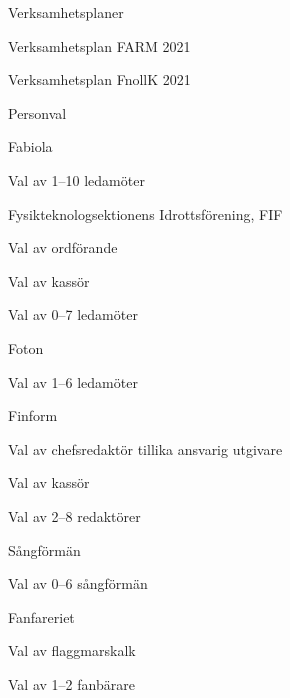 \documentclass{sektionsmote}
\begin{document}
\begin{ootd}
\item{Verksamhetsplaner}
\begin{ootd}
    \item Verksamhetsplan FARM 2021
    \item Verksamhetsplan FnollK 2021
\end{ootd}


\item{Personval}
\begin{ootd}
    \item Fabiola
    \begin{ootd}
        \item Val av 1--10 ledamöter
    \end{ootd}
    \item Fysikteknologsektionens Idrottsförening, FIF
    \begin{ootd}
        \item Val av ordförande
        \item Val av kassör
        \item Val av 0--7 ledamöter
    \end{ootd}
    \item Foton
    \begin{ootd}
        \item Val av 1--6 ledamöter
    \end{ootd}
    \item Finform
    \begin{ootd}
        \item Val av chefsredaktör tillika ansvarig utgivare
        \item Val av kassör
        \item Val av 2--8 redaktörer
    \end{ootd}
    \item Sångförmän
    \begin{ootd}
        \item Val av 0--6 sångförmän
    \end{ootd}
    \item Fanfareriet
    \begin{ootd}
        \item Val av flaggmarskalk
        \item Val av 1--2 fanbärare
    \end{ootd}

\end{ootd}
\end{ootd}
\end{document}
